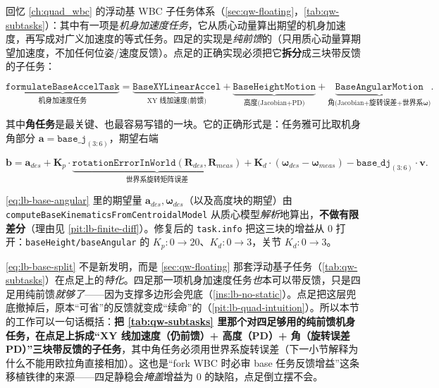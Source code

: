 回忆 \cref{ch:quad_wbc} 的浮动基 WBC 子任务体系（\cref{sec:qw-floating}，\cref{tab:qw-subtasks}）：其中有一项是\emph{机身加速度任务}，它从质心动量算出期望的机身加速度，再写成对广义加速度的等式任务。四足的实现是\emph{纯前馈}的（只用质心动量算期望加速度，不加任何位姿/速度反馈）。点足的正确实现必须把它\textbf{拆分}成三块带反馈的子任务：

\begin{equation}
  \underbrace{\texttt{formulateBaseAccelTask}}_{\text{机身加速度任务}}
  =\underbrace{\texttt{BaseXYLinearAccel}}_{\text{XY 线加速度(前馈)}}
  +\underbrace{\texttt{BaseHeightMotion}}_{\text{高度(Jacobian+PD)}}
  +\underbrace{\texttt{BaseAngularMotion}}_{\text{角(Jacobian+旋转误差+世界系}\boldsymbol\omega)}.
  \label{eq:lb-base-split}
\end{equation}

其中\textbf{角任务}是最关键、也最容易写错的一块。它的正确形式是：任务雅可比取机身角部分 $\mathbf{a}=\texttt{base\_j}_{(3:6)}$，期望右端

\begin{equation}
  \mathbf{b}=\mathbf{a}_{des}
  +\mathbf{K}_p\cdot\underbrace{\texttt{rotationErrorInWorld}(\mathbf{R}_{des},\mathbf{R}_{meas})}_{\text{世界系旋转矩阵误差}}
  +\mathbf{K}_d\cdot(\boldsymbol\omega_{des}-\boldsymbol\omega_{meas})
  -\texttt{base\_dj}_{(3:6)}\cdot\mathbf{v}.
  \label{eq:lb-base-angular}
\end{equation}

\cref{eq:lb-base-angular} 里的期望量 $\mathbf{a}_{des},\boldsymbol\omega_{des}$（以及高度块的期望）由 \texttt{computeBaseKinematicsFromCentroidalModel} 从质心模型\emph{解析}地算出，\textbf{不做有限差分}（理由见 \cref{pit:lb-finite-diff}）。修复后的 \texttt{task.info} 把这三块的增益从 $0$ 打开：\texttt{baseHeight/baseAngular} 的 $K_p:0\to20$、$K_d:0\to3$，关节 $K_d:0\to3$。

\begin{insight}[拆分 base 任务 = 浮动基子任务在“点足无静稳”下的特化]\label{ins:lb-split-is-specialization}
\cref{eq:lb-base-split} 不是新发明，而是 \cref{sec:qw-floating} 那套浮动基子任务（\cref{tab:qw-subtasks}）在点足上的\emph{特化}。四足那一项机身加速度任务\emph{也}本可以带反馈，只是四足用纯前馈\emph{就够了}——因为支撑多边形会兜底（\cref{ins:lb-no-static}）。点足把这层兜底撤掉后，原本“可省”的反馈就变成“续命”的（\cref{pit:lb-quad-intuition}）。所以本节的工作可以一句话概括：\textbf{把 \cref{tab:qw-subtasks} 里那个对四足够用的纯前馈机身任务，在点足上拆成“XY 线加速度（仍前馈）+ 高度（PD）+ 角（旋转误差 PD）”三块带反馈的子任务}，其中角任务必须用世界系旋转误差（下一小节解释为什么不能用欧拉角直接相加）。这也是“fork WBC 时必审 base 任务反馈增益”这条移植铁律的来源——四足静稳会\emph{掩盖}增益为 $0$ 的缺陷，点足倒立摆不会。
\end{insight}

